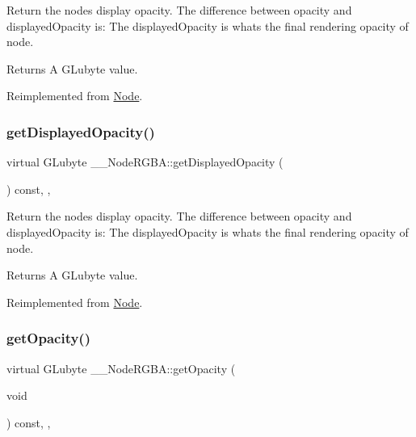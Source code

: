 Return the node\textquotesingle{}s display opacity. The difference between opacity and displayed\+Opacity is\+: The displayed\+Opacity is what\textquotesingle{}s the final rendering opacity of node. \begin{DoxyReturn}{Returns}
A G\+Lubyte value. 
\end{DoxyReturn}


Reimplemented from \hyperlink{classNode_ac4f9c61560c8862ebdaecbf79bf8a1b6}{Node}.

\mbox{\label{class____NodeRGBA_adbf1aa17734836db2096f2901d81d304}} 
\subsubsection{\texorpdfstring{get\+Displayed\+Opacity()}{getDisplayedOpacity()}\hspace{0.1cm}{\footnotesize\ttfamily [2/2]}}
{\footnotesize\ttfamily virtual G\+Lubyte \+\_\+\+\_\+\+Node\+R\+G\+B\+A\+::get\+Displayed\+Opacity (\begin{DoxyParamCaption}{ }\end{DoxyParamCaption}) const\hspace{0.3cm}{\ttfamily [inline]}, {\ttfamily [override]}, {\ttfamily [virtual]}}

Return the node\textquotesingle{}s display opacity. The difference between opacity and displayed\+Opacity is\+: The displayed\+Opacity is what\textquotesingle{}s the final rendering opacity of node. \begin{DoxyReturn}{Returns}
A G\+Lubyte value. 
\end{DoxyReturn}


Reimplemented from \hyperlink{classNode_ac4f9c61560c8862ebdaecbf79bf8a1b6}{Node}.

\mbox{\label{class____NodeRGBA_a48a5a78aea7c307ccfbe8c10e053b7c8}} 
\subsubsection{\texorpdfstring{get\+Opacity()}{getOpacity()}\hspace{0.1cm}{\footnotesize\ttfamily [1/2]}}
{\footnotesize\ttfamily virtual G\+Lubyte \+\_\+\+\_\+\+Node\+R\+G\+B\+A\+::get\+Opacity (\begin{DoxyParamCaption}\item[{void}]{ }\end{DoxyParamCaption}) const\hspace{0.3cm}{\ttfamily [inline]}, {\ttfamily [override]}, {\ttfamily [virtual]}}


